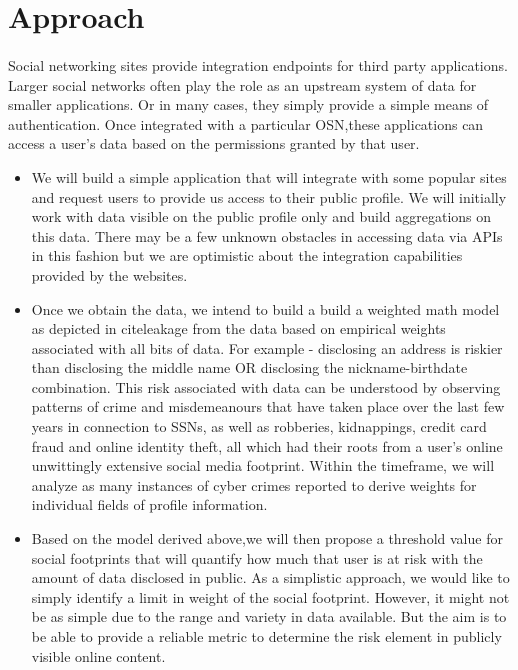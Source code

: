 \documentclass[11pt]{article}
\begin{document}
\section{Approach}
\paragraph{}
Social networking sites provide integration endpoints for third party applications. Larger social networks often play the role as an upstream system of data for smaller applications. Or in many cases, they simply provide a simple means of authentication. Once integrated with a particular OSN,these applications can access a user’s data based on the permissions granted by that user.
  \begin{itemize}
   \item We will build a simple application that will integrate with some popular sites and request users to provide us access to their public profile. We will initially work with data visible on the public profile only and build aggregations on this data. There may be a few unknown obstacles in accessing data via APIs in this fashion but we are optimistic about the integration capabilities provided by the websites.
   \item Once we obtain the data, we intend to build a build a weighted math model as depicted in cite{leakage} from the data based on empirical weights associated with all bits of data. For example - disclosing an address is riskier than disclosing the middle name OR disclosing the nickname-birthdate combination. This risk associated with data can be understood by observing patterns of crime and misdemeanours that have taken place over the last few years in connection to SSNs, as well as robberies, kidnappings, credit card fraud and online identity theft, all which had their roots from a user's online unwittingly extensive social media footprint. Within the timeframe, we will analyze as many instances of cyber crimes reported to derive weights for individual fields of profile information.
   \item Based on the model derived above,we will then propose a threshold value for social footprints that will quantify how much that user is at risk with the amount of data disclosed in public. As a simplistic approach, we would like to simply identify a limit in weight of the social footprint. However, it might not be as simple due to the range and variety in data available. But the aim is to be able to provide a reliable metric to determine the risk element in publicly visible online content.

\end{itemize}
\end{document}
